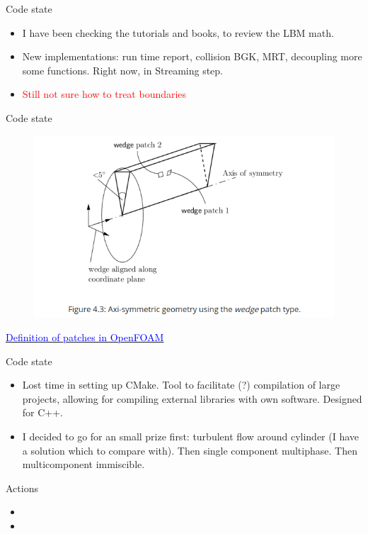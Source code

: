 \documentclass{beamer}
\begin{document}
	\begin{frame}{Code state}
		\begin{itemize}
			\item I have been checking the tutorials and books, to review the LBM math.
			\item New implementations: run time report, collision BGK, MRT, decoupling more some functions. Right now, in Streaming step.
			\item \textcolor{red}{Still not sure how to treat boundaries}
		\end{itemize}
	\end{frame}

	\begin{frame}{Code state}
		\begin{figure}
			\centering
			\includegraphics[scale=0.4]{pics/patchesOF.png}
		\end{figure}
		\href{https://www.openfoam.com/documentation/user-guide/4-mesh-generation-and-conversion/4.2-boundaries}{\textcolor{blue}{Definition of patches in OpenFOAM}}
	\end{frame}

	\begin{frame}{Code state}
		\begin{itemize}
			\item Lost time in setting up CMake. Tool to facilitate (?) compilation of large projects, allowing for compiling external libraries with own software. Designed for C++.
			\item I decided to go for an small prize first: turbulent flow around cylinder (I have a solution which to compare with). Then single component multiphase. Then multicomponent immiscible.
		\end{itemize}
	\end{frame}
	\begin{frame}{Actions}
		\begin{itemize}
			\item 
			\item
		\end{itemize}
	\end{frame}
	
\end{document}
